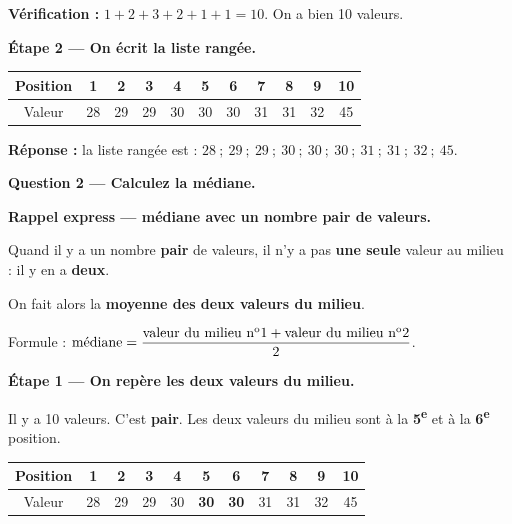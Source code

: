 \documentclass[12pt,a4paper]{article}
\begin{document}
\textbf{Vérification :} $1 + 2 + 3 + 2 + 1 + 1 = 10$. On a bien 10 valeurs.

\vspace{0.3cm}
\textbf{Étape 2 — On écrit la liste rangée.}

\begin{center}
\begin{tabular}{|c|c|c|c|c|c|c|c|c|c|c|}
\hline
Position & 1 & 2 & 3 & 4 & 5 & 6 & 7 & 8 & 9 & 10 \\
\hline
Valeur & 28 & 29 & 29 & 30 & 30 & 30 & 31 & 31 & 32 & 45 \\
\hline
\end{tabular}
\end{center}

\textbf{Réponse :} la liste rangée est : $28 \ ; \ 29 \ ; \ 29 \ ; \ 30 \ ; \ 30 \ ; \ 30 \ ; \ 31 \ ; \ 31 \ ; \ 32 \ ; \ 45$.

\vspace{0.5cm}

\begin{correctionbox}
\textbf{Question 2 — Calculez la médiane.}
\end{correctionbox}

\begin{rappelcible}
\textbf{Rappel express — médiane avec un nombre pair de valeurs.}

\vspace{0.2cm}
Quand il y a un nombre \textbf{pair} de valeurs, il n'y a pas \textbf{une seule} valeur au milieu : il y en a \textbf{deux}.

\vspace{0.2cm}
On fait alors la \textbf{moyenne des deux valeurs du milieu}.

\vspace{0.2cm}
Formule : $\text{médiane} = \dfrac{\text{valeur du milieu n\textsuperscript{o}1} + \text{valeur du milieu n\textsuperscript{o}2}}{2}$.
\end{rappelcible}

\vspace{0.3cm}
\textbf{Étape 1 — On repère les deux valeurs du milieu.}

Il y a 10 valeurs. C'est \textbf{pair}. Les deux valeurs du milieu sont à la \textbf{5\textsuperscript{e}} et à la \textbf{6\textsuperscript{e}} position.

\begin{center}
\begin{tabular}{|c|c|c|c|c|c|c|c|c|c|c|}
\hline
Position & 1 & 2 & 3 & 4 & \textbf{5} & \textbf{6} & 7 & 8 & 9 & 10 \\
\hline
Valeur & 28 & 29 & 29 & 30 & \textbf{30} & \textbf{30} & 31 & 31 & 32 & 45 \\
\hline
\end{tabular}
\end{center}
\end{document}
